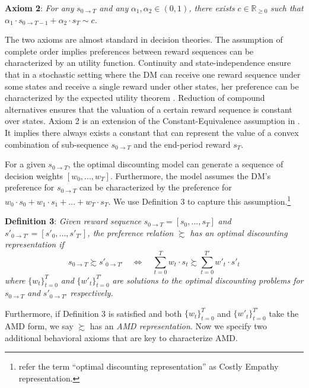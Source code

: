 \documentclass[
  12pt,
]{article}
\begin{document}
\noindent \textbf{Axiom 2}: \emph{For any} \(s_{0\rightarrow T}\)
\emph{and any} \(\alpha_1,\alpha_2 \in (0,1)\)\emph{, there exists}
\(c\in \mathbb{R}_{\geq 0}\) \emph{such that}
\(\alpha_1 \cdot s_{0\rightarrow T-1}+\alpha_2\cdot s_T \sim c\)\emph{.}

The two axioms are almost standard in decision theories. The assumption
of complete order implies preferences between reward sequences can be
characterized by an utility function. Continuity and state-independence
ensure that in a stochastic setting where the DM can receive one reward
sequence under some states and receive a single reward under other
states, her preference can be characterized by the expected utility
theorem \citep{herstein1953axiomatic}. Reduction of compound
alternatives ensures that the valuation of a certain reward sequence is
constant over states. Axiom 2 is an extension of the
Constant-Equivalence assumption in \citet{bleichrodt2008koopmans}. It
implies there always exists a constant that can represent the value of a
convex combination of sub-sequence \(s_{0\rightarrow T}\) and the
end-period reward \(s_T\).

For a given \(s_{0\rightarrow T}\), the optimal discounting model can
generate a sequence of decision weights \([w_0,...,w_T]\). Furthermore,
the model assumes the DM's preference for \(s_{0\rightarrow T}\) can be
characterized by the preference for
\(w_0\cdot s_0+w_1\cdot s_1 +...+w_T\cdot s_T\). We use Definition 3 to
capture this assumption.\footnote{\citet{noor2022optimal} refer the term
  ``optimal discounting representation'' as Costly Empathy
  representation.}

\noindent \textbf{Definition 3}: \emph{Given reward sequence}
\(s_{0\rightarrow T}=[s_0,...,s_T]\) \emph{and}
\(s'_{0\rightarrow T'}=[s'_0,...,s'_{T'}]\)\emph{, the preference
relation} \(\succsim\) \emph{has an optimal discounting representation
if} \[
s_{0\rightarrow T} \succsim s'_{0\rightarrow T'}\quad
\Longleftrightarrow \quad \sum_{t=0}^T w_t\cdot s_t
\succsim \sum_{t=0}^{T'} w'_t \cdot s'_t
\] \emph{where} \(\{w_t\}_{t=0}^T\) \emph{and} \(\{w'_t\}^{T'}_{t=0}\)
\emph{are solutions to the optimal discounting problems for}
\(s_{0\rightarrow T}\) \emph{and} \(s'_{0\rightarrow T'}\)
\emph{respectively.}

Furthermore, if Definition 3 is satisfied and both \(\{w_t\}_{t=0}^T\)
and \(\{w'_t\}^{T'}_{t=0}\) take the AMD form, we say \(\succsim\) has
an \emph{AMD representation}. Now we specify two additional behavioral
axioms that are key to characterize AMD.
\end{document}
